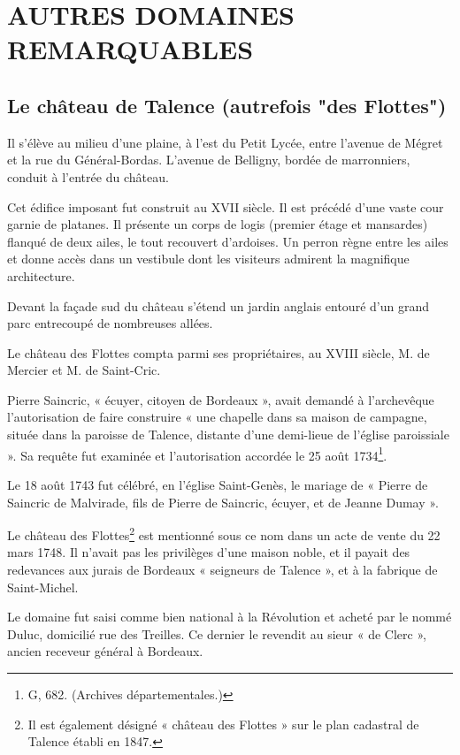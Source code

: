 \section{AUTRES DOMAINES REMARQUABLES}

\subsection{Le château de Talence (autrefois "des Flottes")}

Il s'élève au milieu d'une plaine, à l'est du Petit Lycée, entre l'avenue de Mégret et la rue du Général-Bordas. L'avenue de Belligny, bordée de marronniers, conduit à l'entrée du château.

Cet édifice imposant fut construit au XVII\ieme{} siècle. Il est précédé d'une vaste cour garnie de platanes. Il présente un corps de logis (premier étage et mansardes) flanqué de deux ailes, le tout recouvert d'ardoises. Un perron règne entre les ailes et donne accès dans un vestibule dont les visiteurs admirent la magnifique architecture.

Devant la façade sud du château s'étend un jardin anglais entouré d'un grand parc entrecoupé de nombreuses allées.

Le château des Flottes compta parmi ses propriétaires, au XVIII\ieme{} siècle, M. de Mercier et M. de Saint-Cric.

Pierre Saincric, « écuyer, citoyen de Bordeaux », avait demandé à l'archevêque l'autorisation de faire construire « une chapelle dans sa maison de campagne, située dans la paroisse de Talence, distante d'une demi-lieue de l'église paroissiale ». Sa requête fut examinée et l'autorisation accordée le 25 août 1734\footnote{G, 682. (Archives départementales.)}.

Le 18 août 1743 fut célébré, en l'église Saint-Genès, le mariage de « Pierre de Saincric de Malvirade, fils de Pierre de Saincric, écuyer, et de Jeanne Dumay ».

Le château des Flottes\footnote{Il est également désigné « château des Flottes » sur le plan cadastral de Talence établi en 1847.} est mentionné sous ce nom dans un acte de vente du 22 mars 1748. Il n'avait pas les privilèges d'une maison noble, et il payait des redevances aux jurais de Bordeaux « seigneurs de Talence », et à la fabrique de Saint-Michel.

Le domaine fut saisi comme bien national à la Révolution et acheté par le nommé Duluc, domicilié rue des Treilles. Ce dernier le revendit au sieur « de Clerc », ancien receveur général à Bordeaux.

